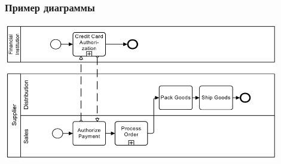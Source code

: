 \documentclass{../../slides-style}
\begin{document}
    \begin{frame}
        \frametitle{Пример диаграммы}
        \begin{center}
            \includegraphics[width=0.9\textwidth]{bpmnExample.png}
        \end{center}
    \end{frame}
\end{document}
